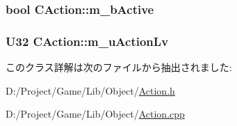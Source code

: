 \subsubsection[{m\+\_\+b\+Active}]{\setlength{\rightskip}{0pt plus 5cm}bool C\+Action\+::m\+\_\+b\+Active\hspace{0.3cm}{\ttfamily [private]}}\label{class_c_action_a55d4d949e48db21e1e1b752e8eb5c2e6}
\hypertarget{class_c_action_abb2dc369fffedd3074d99820f57c2090}{}
\subsubsection[{m\+\_\+u\+Action\+Lv}]{\setlength{\rightskip}{0pt plus 5cm}U32 C\+Action\+::m\+\_\+u\+Action\+Lv\hspace{0.3cm}{\ttfamily [private]}}\label{class_c_action_abb2dc369fffedd3074d99820f57c2090}


このクラス詳解は次のファイルから抽出されました\+:\begin{DoxyCompactItemize}
\item 
D\+:/\+Project/\+Game/\+Lib/\+Object/\hyperlink{_action_8h}{Action.\+h}\item 
D\+:/\+Project/\+Game/\+Lib/\+Object/\hyperlink{_action_8cpp}{Action.\+cpp}\end{DoxyCompactItemize}
